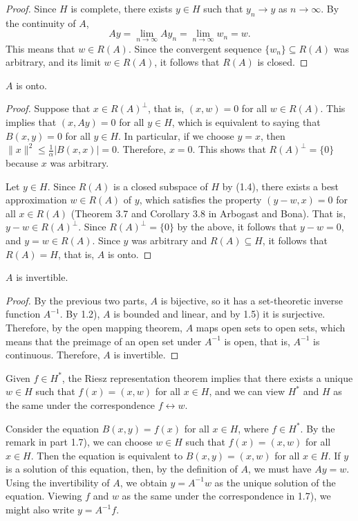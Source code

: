 \documentclass{homework}
\begin{document}
\begin{arabicparts}
\begin{proof}
			Since $H$ is complete, there exists $y \in H$ such that $y_n \to y$ as $n \to \infty$. By the continuity of $A$,
			\begin{equation}
				Ay = \lim_{n\to \infty}Ay_n = \lim_{n\to\infty} w_n = w.
			\end{equation}
			This means that $w \in R(A)$. Since the convergent sequence $\{w_n\}\subseteq R(A)$ was arbitrary, and its limit $w \in R(A)$, it follows that $R(A)$ is closed.
		\end{proof}
		
		\questionpart
		$A$ is onto.
		\begin{proof}
			Suppose that $x \in R(A)^\perp$, that is, $(x, w) = 0$ for all $w \in R(A)$. This implies that $(x, Ay) = 0$ for all $y \in H$, which is equivalent to saying that $B(x, y) = 0$ for all $y \in H$. In particular, if we choose $y = x$, then $\lVert x\rVert^2 \le \frac{1}{\alpha}|B(x, x)| = 0$. Therefore, $x = 0$. This shows that $R(A)^\perp = \{0\}$ because $x$ was arbitrary. 
			
			Let $y \in H$. Since $R(A)$ is a closed subspace of $H$ by (1.4), there exists a best approximation $w \in R(A)$ of $y$, which satisfies the property $(y - w, x) = 0$ for all $x \in R(A)$ (Theorem 3.7 and Corollary 3.8 in Arbogast and Bona). That is, $y-w \in R(A)^\perp$. Since $R(A)^\perp =\{0\}$ by the above, it follows that $y-w = 0$, and $y=w \in R(A)$. Since $y$ was arbitrary and $R(A) \subseteq H$, it follows that $R(A) = H$, that is, $A$  is onto.
		\end{proof}
		
		\questionpart
		$A$ is invertible.
		\begin{proof}
			By the previous two parts, $A$ is bijective, so it has a set-theoretic inverse function $A^{-1}$. By 1.2), $A$ is bounded and linear, and by 1.5) it is surjective. Therefore, by the open mapping theorem, $A$ maps open sets to open sets, which means that the preimage of an open set under $A^{-1}$ is open, that is, $A^{-1}$ is continuous. Therefore, $A$ is invertible.
		\end{proof}
		
		\questionpart
		Given $f \in H^{*}$, the Riesz representation theorem implies that there exists a unique $w \in H$ such that $f(x) = (x,w)$ for all $x \in H$, and we can view $H^{*}$ and $H$ as the same under the correspondence $f \leftrightarrow w$.
		
		\questionpart
		Consider the equation $B(x,y) = f(x)$ for all $x \in H$, where $f \in H^{*}$. By the remark in part 1.7), we can choose $w \in H$ such that $f(x) = (x,w)$ for all $x \in H$. Then the equation is equivalent to $B(x,y) = (x,w)$ for all $x \in H$. If $y$ is a solution of this equation, then, by the definition of $A$, we must have $Ay = w$. Using the invertibility of $A$, we obtain $y = A^{-1}w$ as the unique solution of the equation. Viewing $f$ and $w$ as the same under the correspondence in 1.7), we might also write $y = A^{-1}f$.
	\end{arabicparts}
	
\end{document}
